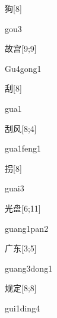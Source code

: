 \begin{verbete}[gou3]{狗}[8]
\begin{pronuncia}{gou3}
\end{pronuncia}
\end{verbete}

\begin{verbete}[Gu4gong1]{故宫}[9;9]
\begin{pronuncia}{Gu4gong1}
\end{pronuncia}
\end{verbete}

\begin{verbete}[gua1]{刮}[8]
\begin{pronuncia}{gua1}
\end{pronuncia}
\end{verbete}

\begin{verbete}{刮风}[8;4]
\begin{pronuncia}{gua1feng1}
\end{pronuncia}
\end{verbete}

\begin{verbete}[guai3]{拐}[8]
\begin{pronuncia}{guai3}
\end{pronuncia}
\end{verbete}

\begin{verbete}{光盘}[6;11]
\begin{pronuncia}{guang1pan2}
\end{pronuncia}
\end{verbete}

\begin{verbete}{广东}[3;5]
\begin{pronuncia}{guang3dong1}
\end{pronuncia}
\end{verbete}

\begin{verbete}{规定}[8;8]
\begin{pronuncia}{gui1ding4}
\end{pronuncia}
\end{verbete}

